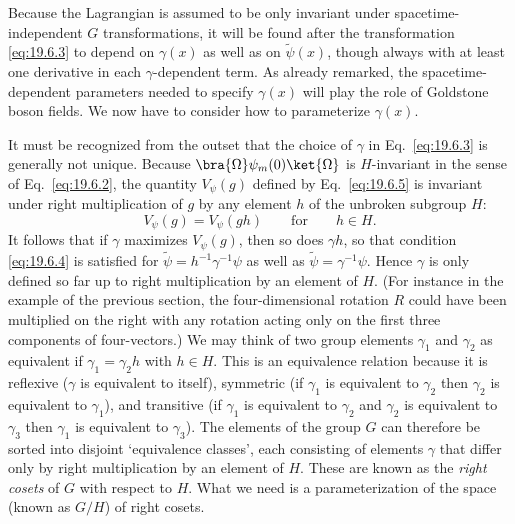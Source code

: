 Because the Lagrangian is assumed to be only invariant under spacetime-independent $G$ transformations, it will be found after the transformation \eqref{eq:19.6.3} to depend on $\gamma(x)$ as well as on $\widetilde\psi(x)$, though always with at least one derivative in each $\gamma$-dependent term. As already remarked, the spacetime-dependent parameters needed to specify $\gamma(x)$ will play the role of Goldstone boson fields. We now have to consider how to parameterize $\gamma(x)$.

It must be recognized from the outset that the choice of $\gamma$ in Eq.~\eqref{eq:19.6.3} is generally not unique. Because $\bra{\Omega}\psi_m(0)\ket{\Omega}$ is $H$-invariant in the sense of Eq.~\eqref{eq:19.6.2}, the quantity $V_\psi(g)$ defined by Eq.~\eqref{eq:19.6.5} is invariant under right multiplication of $g$ by any element $h$ of the unbroken subgroup $H$:
\begin{equation}
V_\psi(g)=V_\psi(gh)\qquad\text{for}\qquad h\in H.
\tag{19.6.6}\label{eq:19.6.6}
\end{equation}
It follows that if $\gamma$ maximizes $V_\psi(g)$, then so does $\gamma h$, so that condition \eqref{eq:19.6.4} is satisfied for $\widetilde\psi=h^{-1}\gamma^{-1}\psi$ as well as $\widetilde\psi=\gamma^{-1}\psi$. Hence $\gamma$ is only defined so far up to right multiplication by an element of $H$. (For instance in the example of the previous section, the four-dimensional rotation $R$ could have been multiplied on the right with any rotation acting only on the first three components of four-vectors.) We may think of two group elements $\gamma_1$ and $\gamma_2$ as equivalent if $\gamma_1=\gamma_2h$ with $h\in H$. This is an equivalence relation because it is reflexive ($\gamma$ is equivalent to itself), symmetric (if $\gamma_1$ is equivalent to $\gamma_2$ then $\gamma_2$ is equivalent to $\gamma_1$), and transitive (if $\gamma_1$ is equivalent to $\gamma_2$ and $\gamma_2$ is equivalent to $\gamma_3$ then $\gamma_1$ is equivalent to $\gamma_3$). The elements of the group $G$ can therefore be sorted into disjoint `equivalence classes', each consisting of elements $\gamma$ that differ only by right multiplication by an element of $H$. These are known as the \emph{right cosets} of $G$ with respect to $H$. What we need is a parameterization of the space (known as $G/H$) of right cosets.


